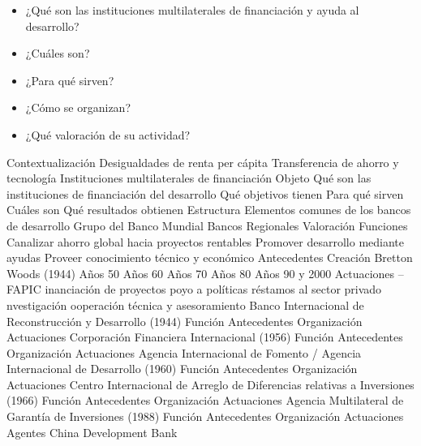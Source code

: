 \documentclass{nuevotema}
\begin{document}

\begin{itemize}
	\item ¿Qué son las instituciones multilaterales de financiación y ayuda al desarrollo?
	\item ¿Cuáles son?
	\item ¿Para qué sirven?
	\item ¿Cómo se organizan?
	\item ¿Qué valoración de su actividad?
\end{itemize}

\esquemacorto

\begin{esquema}[enumerate]
	\1[] 
		\2 Contextualización
			\3 Desigualdades de renta per cápita
			\3 Transferencia de ahorro y tecnología
			\3 Instituciones multilaterales de financiación
		\2 Objeto
			\3 Qué son las instituciones de financiación del desarrollo
			\3 Qué objetivos tienen
			\3 Para qué sirven
			\3 Cuáles son
			\3 Qué resultados obtienen
		\2 Estructura
			\3 Elementos comunes de los bancos de desarrollo
			\3 Grupo del Banco Mundial
			\3 Bancos Regionales
			\3 Valoración
	\1 
		\2 Funciones
			\3 Canalizar ahorro global hacia proyectos rentables
			\3 Promover desarrollo mediante ayudas
			\3 Proveer conocimiento técnico y económico
		\2 Antecedentes
			\3 Creación Bretton Woods (1944)
			\3 Años 50
			\3 Años 60
			\3 Años 70
			\3 Años 80
			\3 Años 90 y 2000
		\2 Actuaciones -- FAPIC
			\3 inanciación de proyectos
			\3 poyo a políticas
			\3 réstamos al sector privado
			\3 nvestigación
			\3 ooperación técnica y asesoramiento
	\1 
		\2 Banco Internacional de Reconstrucción y Desarrollo (1944)
			\3 Función
			\3 Antecedentes
			\3 Organización
			\3 Actuaciones
		\2 Corporación Financiera Internacional (1956)
			\3 Función
			\3 Antecedentes
			\3 Organización
			\3 Actuaciones
		\2 Agencia Internacional de Fomento / Agencia Internacional de Desarrollo (1960)
			\3 Función
			\3 Antecedentes
			\3 Organización
			\3 Actuaciones
		\2 Centro Internacional de Arreglo de Diferencias relativas a Inversiones (1966)
			\3 Función
			\3 Antecedentes
			\3 Organización
			\3 Actuaciones
		\2 Agencia Multilateral de Garantía de Inversiones (1988)
			\3 Función
			\3 Antecedentes
			\3 Organización
			\3 Actuaciones
	\1 
		\2 Agentes
			\3 China Development Bank

\end{esquema}
\end{document}

